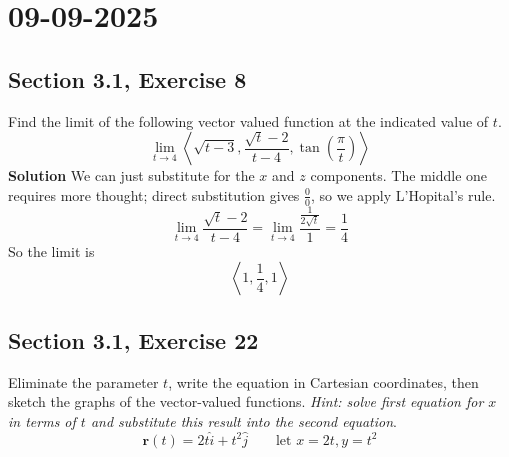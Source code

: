\documentclass[]{mangos-musings}
\begin{document}

\newpage
\section{09-09-2025}
\subsection{Section 3.1, Exercise 8}
Find the limit of the following vector valued function at the indicated value of $t$.
\[\lim_{t\to 4}\left\langle \sqrt{t-3}, \dfrac{\sqrt{t} - 2}{t-4}, \tan\left(\dfrac{\pi}{t}\right)\right\rangle\]
\textbf{Solution} We can just substitute for the $x$ and $z$ components. The middle one requires more thought; direct substitution gives $\frac{0}{0}$, so we apply L'Hopital's rule.
\[\lim_{t\to 4} \dfrac{\sqrt{t}-2}{t-4} = \lim_{t\to 4} \dfrac{\frac{1}{2\sqrt{t}}}{1} = \dfrac{1}{4}\]
So the limit is 
\[\left\langle1, \dfrac{1}{4}, 1\right\rangle\]

\subsection{Section 3.1, Exercise 22}
Eliminate the parameter $t$, write the equation in Cartesian coordinates, then sketch the graphs of the vector-valued functions. \textit{Hint: solve first equation for $x$ in terms of $t$ and substitute this result into the second equation}.
\[\mathbf{r}(t) = 2t \hat{i} + t^2 \hat{j} \qquad \text{let }x=2t, y=t^2\]
\begin{align*}
  \\ \\ \\ \\ \\ \\
\end{align*}
\end{document}
